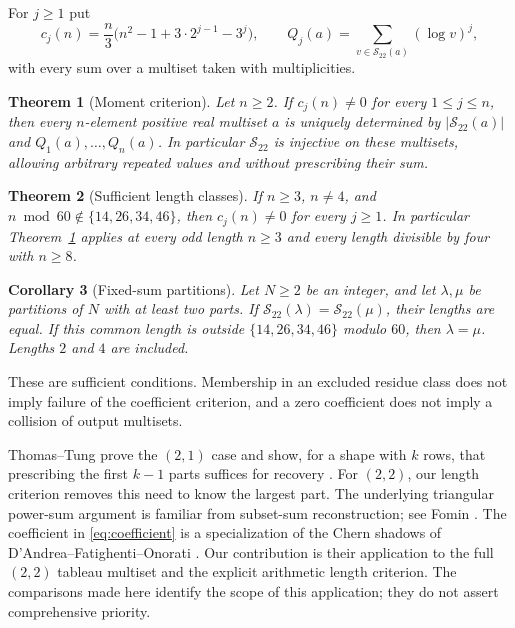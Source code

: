 \documentclass[11pt]{amsart}
\newtheorem{theorem}{Theorem}
\newtheorem{corollary}[theorem]{Corollary}
\theoremstyle{remark}
\newcommand{\Sxx}{\mathcal{S}_{22}}
\begin{document}
For $j\geq1$ put
\begin{equation}\label{eq:coefficient}
 c_j(n)=\frac n3\bigl(n^2-1+3\cdot2^{j-1}-3^j\bigr),
 \qquad
 Q_j(a)=\sum_{v\in\Sxx(a)}(\log v)^j,
\end{equation}
with every sum over a multiset taken with multiplicities.

\begin{theorem}[Moment criterion]\label{thm:criterion}
Let $n\geq2$. If $c_j(n)\ne0$ for every $1\leq j\leq n$, then every
$n$-element positive real multiset $a$ is uniquely determined by
$|\Sxx(a)|$ and $Q_1(a),\ldots,Q_n(a)$. In particular $\Sxx$ is
injective on these multisets, allowing arbitrary repeated values and
without prescribing their sum.
\end{theorem}

\begin{theorem}[Sufficient length classes]\label{thm:classes}
If $n\geq3$, $n\ne4$, and $n\bmod60\notin\{14,26,34,46\}$, then $c_j(n)\ne0$
for every $j\geq1$. In particular Theorem~\ref{thm:criterion} applies
at every odd length $n\geq3$ and every length divisible by four with
$n\geq8$.
\end{theorem}

\begin{corollary}[Fixed-sum partitions]\label{cor:partitions}
Let $N\geq2$ be an integer, and let $\lambda,\mu$ be partitions of $N$ with at
least two parts. If $\Sxx(\lambda)=\Sxx(\mu)$, their lengths are equal.
If this common length is outside $\{14,26,34,46\}$ modulo $60$, then
$\lambda=\mu$. Lengths $2$ and $4$ are included.
\end{corollary}

These are sufficient conditions. Membership in an excluded residue class
does not imply failure of the coefficient criterion, and a zero coefficient
does not imply a collision of output multisets.

Thomas--Tung prove the $(2,1)$ case and show, for a shape with $k$ rows,
that prescribing the first $k-1$ parts suffices for recovery
\cite[Theorems~1.7 and~5.7]{ThomasTung2026}. For $(2,2)$, our length
criterion removes this need to know the largest part.
The underlying triangular power-sum argument is familiar from subset-sum
reconstruction; see Fomin \cite[equation~(1), Theorem~2.1]{Fomin2019}.
The coefficient in \eqref{eq:coefficient} is a specialization of the
Chern shadows of D'Andrea--Fatighenti--Onorati
\cite[Example~4.7, Appendix~A]{DAndreaEtAl2025}.
Our contribution is their application to the full $(2,2)$ tableau multiset
and the explicit arithmetic length criterion. The comparisons made here
identify the scope of this application; they do not assert comprehensive
priority.
\end{document}
